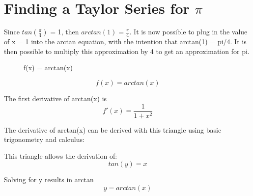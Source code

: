 \documentclass[12pt, titlepage]{article}
\begin{document}
\section{Finding a Taylor Series for \(\pi\)}
Since \(tan(\frac{\pi}{4})\) = 1, then \(arctan(1)= \frac{\pi}{4}\). It is now possible to plug in the value of x = 1 into the arctan equation, with the intention that arctan(1) = pi/4. It is then possible to multiply this approximation by 4 to get an approximation for pi.

\begin{figure}[H]
\centering
    \caption[]{f(x) = arctan(x)}
\end{figure}

\begin{equation}
  f(x) = arctan(x)
\end{equation}

The first derivative of arctan(x) is 
\begin{equation}
f'(x) = \frac{1}{1 + x^{2}}
\end{equation}

\pagebreak
The derivative of arctan(x) can be derived with this triangle using basic trigonometry and calculus:
\begin{figure}[H]
\centering
{}
\end{figure}

This triangle allows the derivation of:
\begin{equation}
 tan(y) = x
\end{equation}

Solving for y results in arctan
\begin{equation}
  y = arctan(x)
\end{equation}
\end{document}
